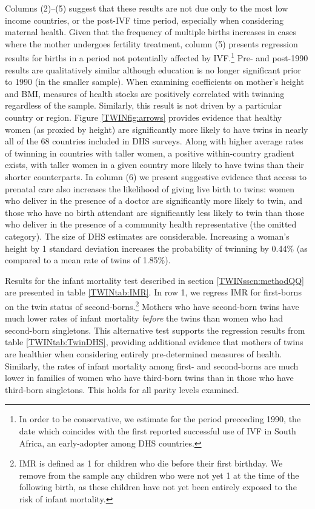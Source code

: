 Columns (2)--(5) suggest that these results are not due only to the most low 
income countries, or the post-IVF time period, especially when considering 
maternal health.  Given that the frequency of multiple births increases in 
cases where the mother undergoes fertility treatment, column (5) presents 
regression results for births in a period not potentially affected by 
IVF.\footnote{In order to be conservative, we estimate for the period 
preceeding 1990, the date which coincides with the first reported successful 
use of IVF in South Africa, an early-adopter among DHS countries.}  Pre- and 
post-1990 results are qualitatively similar although education is no longer 
significant prior to 1990 (in the smaller sample). When examining coefficients
on mother's height and BMI, measures of health stocks are positively correlated 
with twinning regardless of the sample.  Similarly, this result is not driven 
by a particular country or region.  Figure \ref{TWINfig:arrows} provides 
evidence that healthy women (as proxied by height) are significantly more 
likely to have twins in nearly all of the 68 countries included in DHS surveys.  
Along with higher average rates of twinning in countries with taller women, a 
positive within-country gradient exists, with taller women in a given country 
more likely to have twins than their shorter counterparts.  In column (6) we
present suggestive evidence that access to prenatal care also increases the 
likelihood of giving live birth to twins: women who deliver in the presence of 
a doctor are significantly more likely to twin, and those who have no birth
attendant are significantly less likely to twin than those who deliver in the 
presence of a community health representative (the omitted category). The size 
of DHS estimates are considerable. Increasing a woman's height by 1 standard 
deviation increases the probability of twinning by 0.44\% (as compared to a mean 
rate of twins of 1.85\%).

Results for the infant mortality test described in section \ref{TWINsscn:methodQQ} 
are presented in table \ref{TWINtab:IMR}. In row 1, we regress IMR for first-borns
on the twin status of second-borns.\footnote{IMR is defined as 1 for children
who die before their first birthday.  We remove from the sample any children who
were not yet 1 at the time of the following birth, as these children have not
yet been entirely exposed to the risk of infant mortality.}  Mothers who have 
second-born twins have much lower rates of infant mortality \emph{before} the 
twins than women who had second-born singletons.  This alternative test supports
the regression results from table \ref{TWINtab:TwinDHS}, providing additional 
evidence that mothers of twins are healthier when considering entirely 
pre-determined measures of health. Similarly, the rates of infant mortality among 
first- and second-borns are much lower in families of women who have third-born 
twins than in those who have third-born singletons.  This holds for all parity 
levels examined.

